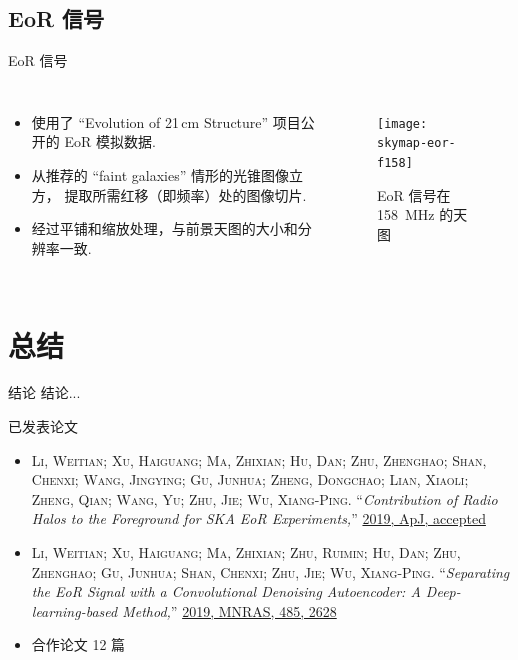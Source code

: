\documentclass{beamer}
\begin{document}
\subsection{EoR 信号}

\begin{frame}{EoR 信号}
  \begin{columns}
    \begin{itemize}
      \item 使用了 \enquote{Evolution of 21\,cm Structure}
        项目公开的 EoR 模拟数据.
      \item 从推荐的 \enquote{faint galaxies} 情形的光锥图像立方，
        提取所需红移（即频率）处的图像切片.
      \item 经过平铺和缩放处理，与前景天图的大小和分辨率一致.
    \end{itemize}

    \begin{figure}
      \centering
      \texttt{[image: skymap-eor-f158]}
      \caption{EoR 信号在 \SI{158}{\MHz} 的天图}
    \end{figure}
  \end{columns}
\end{frame}

\section{总结}

\begin{frame}{结\cspace{}论}
  结论...
\end{frame}

\begin{frame}{已发表论文}
  \small
  \begin{itemize}
    \item
      \textsc{\alert{Li, Weitian}; Xu, Haiguang; Ma, Zhixian; Hu, Dan;
      Zhu, Zhenghao; Shan, Chenxi; Wang, Jingying; Gu, Junhua;
      Zheng, Dongchao; Lian, Xiaoli; Zheng, Qian; Wang, Yu;
      Zhu, Jie; Wu, Xiang-Ping}.
      \enquote{\it Contribution of Radio Halos to the Foreground for
        SKA EoR Experiments,}
      \href{http://adsabs.harvard.edu/abs/arXiv:1905.05399}{%
        2019, ApJ, accepted}
    \item
      \textsc{\alert{Li, Weitian}; Xu, Haiguang; Ma, Zhixian; Zhu, Ruimin;
      Hu, Dan; Zhu, Zhenghao; Gu, Junhua; Shan, Chenxi; Zhu, Jie;
      Wu, Xiang-Ping}.
      \enquote{\it Separating the EoR Signal with a Convolutional Denoising
        Autoencoder: A Deep-learning-based Method,}
      \href{http://adsabs.harvard.edu/abs/2019MNRAS.485.2628L}{%
        2019, MNRAS, 485, 2628}
    \item
      合作论文 12 篇
  \end{itemize}
\end{frame}
\end{document}
